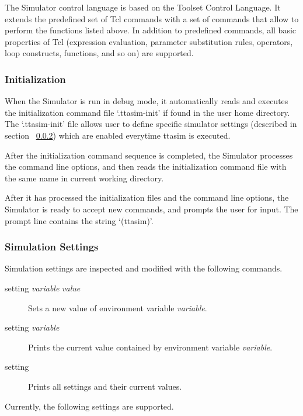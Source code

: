 \documentclass[a4paper,twoside]{tceusermanual}
\begin{document}
The Simulator control language is based on the Toolset Control
Language.  It extends the predefined set of Tcl commands
with a set of commands that allow to perform the functions listed above.  In
addition to predefined commands, all basic properties of Tcl (expression
evaluation, parameter substitution rules, operators, loop constructs,
functions, and so on) are supported.

\subsubsection{Initialization}

When the Simulator is run in debug mode, it automatically reads and executes
the initialization command file `.ttasim-init' if found in the user home
directory. The `.ttasim-init' file allows user to define specific simulator
settings (described in section ~\ref{ssec:debug-set}) which are enabled
everytime ttasim is executed.

After the initialization command sequence is completed, the
Simulator processes the command line options, and then reads the
initialization command file with the same name in current working directory.

After it has processed the initialization files and the command line options,
the Simulator is ready to accept new commands, and prompts the user for
input. The prompt line contains the string `(ttasim)'.

\subsubsection{Simulation Settings}
\label{ssec:debug-set}

Simulation settings are inspected and modified with the following commands.

\begin{description}
\item[setting \emph{variable} \emph{value}] %
  Sets a new value of environment variable \emph{variable}.
\item[setting \emph{variable}] %
  Prints the current value contained by environment variable
  \emph{variable}.
\item[setting] %
  Prints all settings and their current values. 
\end{description}

Currently, the following settings are supported.
\end{document}
